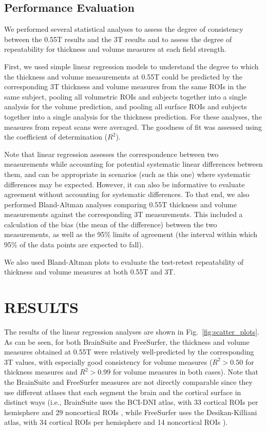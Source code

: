 \documentclass[12pt,letterpaper,onecolumn]{article}
\begin{document}
\subsection{Performance Evaluation}
We performed several statistical analyses to assess the degree of consistency between the 0.55T results and the 3T results and to assess the degree of repeatability for thickness and volume measures at each field strength.

First, we used simple linear regression models to understand the degree to which the thickness and volume measurements at 0.55T could be predicted by the corresponding 3T thickness and volume measures from the same ROIs in the same subject, pooling all volumetric ROIs and subjects together into a single analysis for the volume prediction, and pooling all surface ROIs and subjects together into a single analysis for the thickness prediction. For these analyses, the measures from repeat scans were averaged. The goodness of fit was assessed using the coefficient of determination ($R^2$).  

{Note that linear regression assesses the correspondence between two measurements while accounting for potential systematic linear differences between them, and can be  appropriate in scenarios (such as this one) where systematic differences may be expected.  However, it can also be informative to evaluate agreement without accounting for systematic differences.  To that end, we also performed Bland-Altman analyses\cite{altman1983measurement} comparing 0.55T thickness and volume measurements against the corresponding 3T measurements.} This included a calculation of the bias (the mean of the difference) between the two measurements, as well as the 95\% limits of agreement (the interval within which 95\% of the data points are expected to fall). 

We also used Bland-Altman plots  to evaluate the test-retest repeatability of thickness and volume measures at both 0.55T and 3T. 

\section{RESULTS}
\label{sec:results}
The results of the linear regression analyses are shown in Fig.~\ref{fig:scatter_plots}. As can be seen, for both BrainSuite and FreeSurfer, the thickness and volume measures obtained at 0.55T were { relatively well-predicted} by the corresponding 3T values, with especially good consistency for volume measures ($R^2 > 0.50$ for thickness measures and $R^2>0.99$ for volume measures in both cases).  Note that the BrainSuite and FreeSurfer measures are not directly comparable since they use different atlases that each segment the brain and the cortical surface in distinct ways (i.e., BrainSuite uses the BCI-DNI atlas, with 33 cortical ROIs per hemisphere and 29 noncortical ROIs \cite{joshi_hybrid_2022}, while FreeSurfer  uses the Desikan-Killiani atlas, with 34 cortical ROIs per hemisphere and 14 noncortical ROIs \cite{desikan_automated_2006}). 
\end{document}
